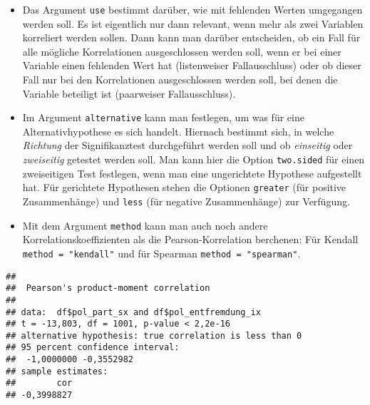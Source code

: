 \documentclass[
]{book}
\newenvironment{Shaded}{\begin{snugshade}}{\end{snugshade}}
\newcommand{\AttributeTok}[1]{\textcolor[rgb]{0.77,0.63,0.00}{#1}}
\newcommand{\FunctionTok}[1]{\textcolor[rgb]{0.00,0.00,0.00}{#1}}
\newcommand{\NormalTok}[1]{#1}
\newcommand{\SpecialCharTok}[1]{\textcolor[rgb]{0.00,0.00,0.00}{#1}}
\newcommand{\StringTok}[1]{\textcolor[rgb]{0.31,0.60,0.02}{#1}}
\begin{document}
\begin{itemize}
\item
  Das Argument \texttt{use} bestimmt darüber, wie mit fehlenden Werten umgegangen werden soll. Es ist eigentlich nur dann relevant, wenn mehr als zwei Variablen korreliert werden sollen. Dann kann man darüber entscheiden, ob ein Fall für alle mögliche Korrelationen ausgeschlossen werden soll, wenn er bei einer Variable einen fehlenden Wert hat (listenweiser Fallausschluss) oder ob dieser Fall nur bei den Korrelationen ausgeschlossen werden soll, bei denen die Variable beteiligt ist (paarweiser Fallausschluss).
\item
  Im Argument \texttt{alternative} kann man festlegen, um was für eine Alternativhypothese es sich handelt. Hiernach bestimmt sich, in welche \emph{Richtung} der Signifikanztest durchgeführt werden soll und ob \emph{einseitig} oder \emph{zweiseitig} getestet werden soll. Man kann hier die Option \texttt{two.sided} für einen zweiseitigen Test festlegen, wenn man eine ungerichtete Hypothese aufgestellt hat. Für gerichtete Hypothesen stehen die Optionen \texttt{greater} (für positive Zusammenhänge) und \texttt{less} (für negative Zusammenhänge) zur Verfügung.
\item
  Mit dem Argument \texttt{method} kann man auch noch andere Korrelationskoeffizienten als die Pearson-Korrelation berchenen: Für Kendall \texttt{method\ =\ "kendall"} und für Spearman \texttt{method\ =\ "spearman"}.
\end{itemize}

\begin{Shaded}
\end{Shaded}

\begin{verbatim}
## 
##  Pearson's product-moment correlation
## 
## data:  df$pol_part_sx and df$pol_entfremdung_ix
## t = -13,803, df = 1001, p-value < 2,2e-16
## alternative hypothesis: true correlation is less than 0
## 95 percent confidence interval:
##  -1,0000000 -0,3552982
## sample estimates:
##        cor 
## -0,3998827
\end{verbatim}
\end{document}

